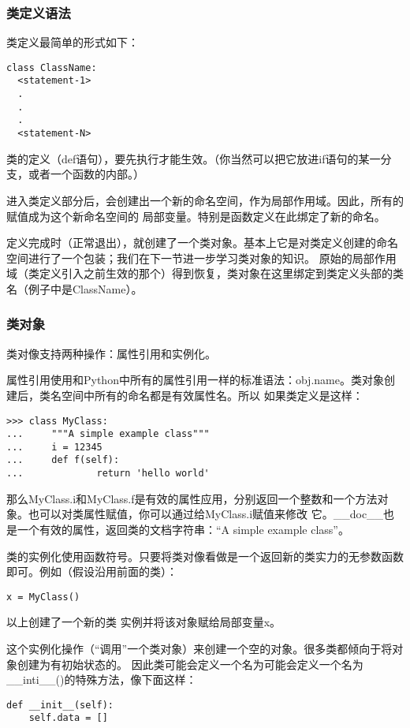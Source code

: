 \documentclass[UTF8]{ctexart}
\begin{document}
\subsubsection{类定义语法}
类定义最简单的形式如下：
\begin{verbatim}
class ClassName:
  <statement-1>
  .
  .
  .
  <statement-N>
\end{verbatim}

类的定义（def语句），要先执行才能生效。（你当然可以把它放进if语句的某一分支，或者一个函数的内部。）

进入类定义部分后，会创建出一个新的命名空间，作为局部作用域。因此，所有的赋值成为这个新命名空间的
局部变量。特别是函数定义在此绑定了新的命名。

定义完成时（正常退出），就创建了一个类对象。基本上它是对类定义创建的命名空间进行了一个包装；我们在下一节进一步学习类对象的知识。
原始的局部作用域（类定义引入之前生效的那个）得到恢复，类对象在这里绑定到类定义头部的类名（例子中是ClassName）。
\subsubsection{类对象}
类对像支持两种操作：属性引用和实例化。

属性引用使用和Python中所有的属性引用一样的标准语法：obj.name。类对象创建后，类名空间中所有的命名都是有效属性名。所以
如果类定义是这样：
\begin{verbatim}
>>> class MyClass:
...     """A simple example class"""
...     i = 12345
...     def f(self):
...             return 'hello world'
\end{verbatim}

那么MyClass.i和MyClass.f是有效的属性应用，分别返回一个整数和一个方法对象。也可以对类属性赋值，你可以通过给MyClass.i赋值来修改
它。\_\_doc\_\_也是一个有效的属性，返回类的文档字符串：``A simple example class''。

类的实例化使用函数符号。只要将类对像看做是一个返回新的类实力的无参数函数即可。例如（假设沿用前面的类）：
\begin{verbatim}
x = MyClass()
\end{verbatim}

以上创建了一个新的类 实例并将该对象赋给局部变量x。

这个实例化操作（``调用''一个类对象）来创建一个空的对象。很多类都倾向于将对象创建为有初始状态的。
因此类可能会定义一个名为可能会定义一个名为\_\_inti\_\_()的特殊方法，像下面这样：
\begin{verbatim}
def __init__(self):
    self.data = []
\end{verbatim}
\end{document}
